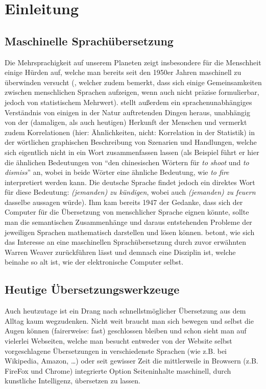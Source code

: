 \section{Einleitung}
\subsection{Maschinelle Sprachübersetzung}
Die Mehrsprachigkeit auf unserem Planeten zeigt insbesondere für die Menschheit einige Hürden auf, welche man bereits seit den 1950er Jahren maschinell zu überwinden versucht (\cite{rockefeller:warrenWeaver:translation1952}, welcher zudem bemerkt, dass sich einige Gemeinsamkeiten zwischen menschlichen Sprachen aufzeigen, wenn auch nicht präzise formulierbar, jedoch von statistischem Mehrwert).\cite{rockefeller:warrenWeaver:translation1952} stellt außerdem ein sprachenunabhängiges Verständnis von einigen in der Natur auftretenden Dingen heraus, unabhängig von der (damaligen, als auch heutigen) Herkunft der Menschen und vermerkt zudem Korrelationen (hier: Ähnlichkeiten, nicht: Korrelation in der Statistik) in der wörtlichen graphischen Beschreibung von Szenarien und Handlungen, welche sich eigentlich nicht in ein Wort zusammenfassen lassen (als Beispiel führt er hier die ähnlichen Bedeutungen von \enquote{den chinesischen Wörtern für \textit{to shoot} und \textit{to dismiss}} an, wobei in beide Wörter eine ähnliche Bedeutung, wie \textit{to fire} interpretiert werden kann. Die deutsche Sprache findet jedoch ein direktes Wort für diese Bedeutung: \textit{(jemanden) zu kündigen}, wobei auch \textit{(jemanden) zu feuern} dasselbe aussagen würde). Ihm kam bereits 1947 der Gedanke, dass sich der Computer für die Übersetzung von menschlicher Sprache eignen könnte, sollte man die semantischen Zusammenhänge und daraus entstehenden Probleme der jeweiligen Sprachen mathematisch darstellen und lösen können.\cite{associationForComputingMachinery:adamLopez:statisticalMachineTranslation2008} betont, wie sich das Interesse an eine maschinellen Sprachübersetzung durch zuvor erwähnten Warren Weaver zurückführen lässt und demnach eine Disziplin ist, welche beinahe so alt ist, wie der elektronische Computer selbst.

\subsection{Heutige Übersetzungswerkzeuge}
Auch heutzutage ist ein Drang nach schnellstmöglicher Übersetzung aus dem Alltag kaum wegzudenken. Nicht weit braucht man sich bewegen und selbst die Augen können (fairerweise: fast) geschlossen bleiben und schon sieht man auf vielerlei Webseiten, welche man besucht entweder von der Website selbst vorgeschlagene Übersetzungen in verschiedenste Sprachen (wie z.B. bei Wikipedia, Amazon, \ldots) oder seit gewisser Zeit die mittlerweile in Browsern (z.B. FireFox und Chrome) integrierte Option Seiteninhalte maschinell, durch kunstliche Intelligenz, übersetzen zu lassen.

